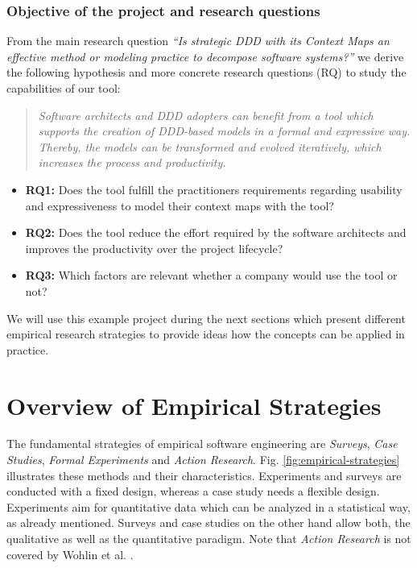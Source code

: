 \documentclass[runningheads]{llncs}
\begin{document}
\subsubsection{Objective of the project and research questions}
From the main research question \textit{``Is strategic DDD with its Context Maps an effective method or modeling practice to decompose software systems?''} we derive the following hypothesis and more concrete research questions (RQ) to study the capabilities of our tool:

\begin{quotation}
	\textit{Software architects and DDD adopters can benefit from a tool which supports the creation of DDD-based models in a formal and expressive way. Thereby, the models can be transformed and evolved iteratively, which increases the process and productivity.}
\end{quotation}

\begin{itemize}
	\item \textbf{RQ1:} Does the tool fulfill the practitioners requirements regarding usability and expressiveness to model their context maps with the tool?
	\item \textbf{RQ2:} Does the tool reduce the effort required by the software architects and improves the productivity over the project lifecycle?
	\item \textbf{RQ3:} Which factors are relevant whether a company would use the tool or not?
\end{itemize}

We will use this example project during the next sections which present different empirical research strategies to provide ideas how the concepts can be applied in practice.

\section{Overview of Empirical Strategies}\label{empirical-strategy-overview}
The fundamental strategies of empirical software engineering are \textit{Surveys}, \textit{Case Studies}, \textit{Formal Experiments} and \textit{Action Research}. Fig. \ref{fig:empirical-strategies} illustrates these methods and their characteristics. Experiments and surveys are conducted with a fixed design, whereas a case study needs a flexible design. Experiments aim for quantitative data which can be analyzed in a statistical way, as already mentioned. Surveys and case studies on the other hand allow both, the qualitative as well as the quantitative paradigm. Note that \textit{Action Research} is not covered by Wohlin et al. \cite{Wohlin:2012:ESE:2349018}.
\end{document}
